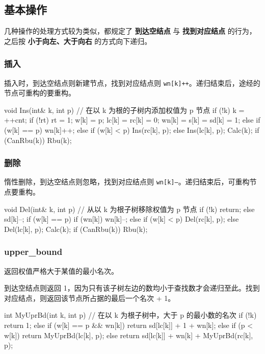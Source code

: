 \subsection{基本操作}

几种操作的处理方式较为类似，都规定了 \textbf{ 到达空结点 } 与 \textbf{ 找到对应结点 } 的行为，之后按 \textbf{ 小于向左、大于向右 } 的方式向下递归。

\subsubsection{插入}

插入时，到达空结点则新建节点，找到对应结点则 \texttt{wn[k]++}。递归结束后，途经的节点可重构的要重构。

\begin{cppcode}
void Ins(int& k, int p) {
  // 在以 k 为根的子树内添加权值为 p 节点
  if (!k) {
    k = ++cnt;
    if (!rt) rt = 1;
    w[k] = p;
    lc[k] = rc[k] = 0;
    wn[k] = s[k] = sd[k] = 1;
  } else {
    if (w[k] == p)
      wn[k]++;
    else if (w[k] < p)
      Ins(rc[k], p);
    else
      Ins(lc[k], p);
    Calc(k);
    if (CanRbu(k)) Rbu(k);
  }
}
\end{cppcode}

\subsubsection{删除}

惰性删除，到达空结点则忽略，找到对应结点则 \texttt{wn[k]--}。递归结束后，可重构节点要重构。

\begin{cppcode}
void Del(int& k, int p) {
  // 从以 k 为根子树移除权值为 p 节点
  if (!k)
    return;
  else {
    sd[k]--;
    if (w[k] == p) {
      if (wn[k]) wn[k]--;
    } else {
      if (w[k] < p)
        Del(rc[k], p);
      else
        Del(lc[k], p);
      Calc(k);
    }
  }
  if (CanRbu(k)) Rbu(k);
}
\end{cppcode}

\subsubsection{upper\_bound}

返回权值严格大于某值的最小名次。

到达空结点则返回 1，因为只有该子树左边的数均小于查找数才会递归至此。找到对应结点，则返回该节点所占据的最后一个名次 + 1。

\begin{cppcode}
int MyUprBd(int k, int p) {
  // 在以 k 为根子树中，大于 p 的最小数的名次
  if (!k)
    return 1;
  else if (w[k] == p && wn[k])
    return sd[lc[k]] + 1 + wn[k];
  else if (p < w[k])
    return MyUprBd(lc[k], p);
  else
    return sd[lc[k]] + wn[k] + MyUprBd(rc[k], p);
}
\end{cppcode}

